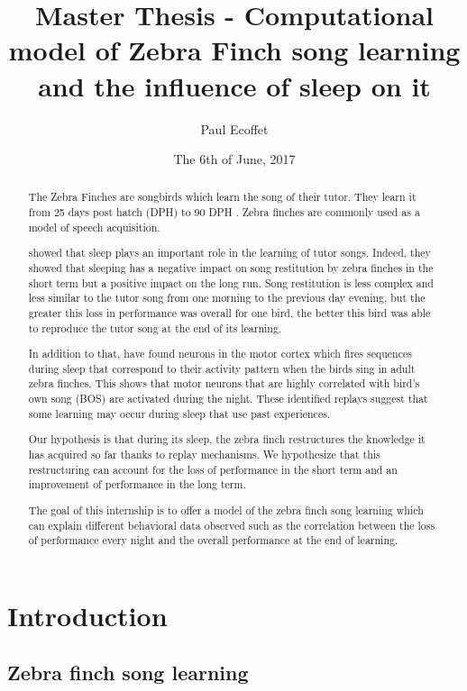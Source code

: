 \documentclass[a4paper]{report}
\title{Master Thesis - Computational model of Zebra Finch song learning and the
influence of sleep on it}
\author{Paul Ecoffet}
\date{The 6th of June, 2017}
\begin{document}
\maketitle

\begin{abstract}
The Zebra Finches are songbirds which learn the song of their tutor. They learn
it from 25 days post hatch (DPH) to 90 DPH \parencite{liu_juvenile_2004}. Zebra
finches are commonly used as a model of speech acquisition.

\textcite{deregnaucourt_how_2005} showed that sleep plays an important role in
the learning of tutor songs. Indeed, they showed that sleeping has a negative
impact on song restitution by zebra finches in the short term but a positive
impact on the long run. Song restitution is less complex and less similar to the
tutor song from one morning to the previous day evening, but the greater this
loss in performance was overall for one bird, the better this bird was able to
reproduce the tutor song at the end of its learning.

In addition to that, \textcite{dave_song_2000} have found neurons in the motor
cortex which fires sequences during sleep that correspond to their activity
pattern when the birds sing in adult zebra finches. This shows that motor
neurons that are highly correlated with bird's own song (BOS) are activated
during the night. These identified replays suggest that some learning may occur
during sleep that use past experiences.

Our hypothesis is that during its sleep, the zebra finch restructures the
knowledge it has acquired so far thanks to replay mechanisms. We hypothesize
that this restructuring can account for the loss of performance in the short
term and an improvement of performance in the long term.

The goal of this internship is to offer a model of the zebra finch song
learning which can explain different behavioral data observed such as the
correlation between the loss of performance every night and the overall
performance at the end of learning.
\end{abstract}

\tableofcontents

\chapter{Introduction}

\section{Zebra finch song learning}
\end{document}
